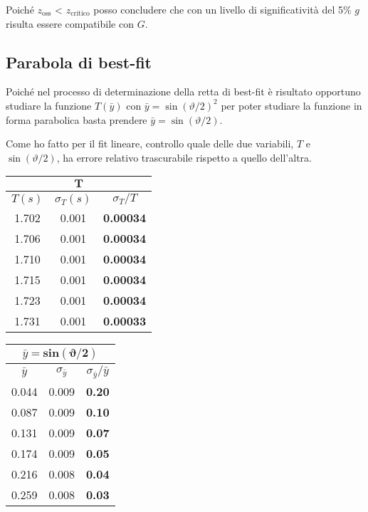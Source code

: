 \documentclass{article}
\begin{document}
	\noindent
	Poiché $z_\text{oss}$ < $z_{\text{critico}}$ posso concludere che con un livello di significatività del 5\% $g$ risulta essere compatibile con $G$.
	
	
	\subsection{Parabola di best-fit}
	Poiché nel processo di determinazione della retta di best-fit è risultato opportuno studiare la funzione $T(\bar{y})$ con $\bar{y} = \sin{\left( \vartheta / 2\right)}^2$ per poter studiare la funzione in forma parabolica basta prendere $\bar{y} =  \sin{\left( \vartheta / 2\right)}$.
	
	Come ho fatto per il fit lineare, controllo quale delle due variabili, $T$ e $ \sin{\left( \vartheta / 2\right)}$, ha errore relativo trascurabile rispetto a quello dell'altra.
	
	
	\begin{minipage}{0.5\textwidth}
		\begin{table}[H]
			\centering
			\begin{tabular}{@{}ccc@{}}
				\multicolumn{3}{c}{$\mathbf{T}$} \\ \midrule
				$T(s)$ & $\sigma_T (s)$ & $\sigma_T / T$ \\ \midrule
				1.702 & 0.001 & \textbf{0.00034} \\
				1.706 & 0.001 & \textbf{0.00034} \\
				1.710 & 0.001 & \textbf{0.00034} \\
				1.715 & 0.001 & \textbf{0.00034} \\
				1.723 & 0.001 & \textbf{0.00034} \\
				1.731 & 0.001 & \textbf{0.00033}  \\ \bottomrule   
			\end{tabular}
		\end{table}
	\end{minipage}
	\begin{minipage}{0.5\textwidth}
		\begin{table}[H]
			\centering
			\begin{tabular}{@{}ccc@{}}
				
				\multicolumn{3}{c}{$\bar{y} = \mathbf{sin{\left(\vartheta/2\right)}}$} \\ \midrule
				$\bar{y}$ & $\sigma_{\bar{y}}$ & $\sigma_{\bar{y}} / \bar{y}$ \\ \midrule
				0.044 & 0.009 & \textbf{0.20} \\
				0.087 & 0.009 & \textbf{0.10} \\
				0.131 & 0.009 & \textbf{0.07} \\
				0.174 & 0.009 & \textbf{0.05} \\
				0.216 & 0.008 & \textbf{0.04} \\
				0.259 & 0.008 & \textbf{0.03}  \\ \bottomrule  
			\end{tabular}
		\end{table}
	\end{minipage}
	\vspace{1cm}
	
\end{document}
